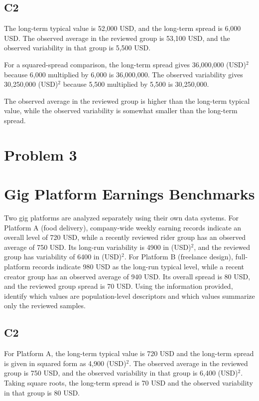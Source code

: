 \begin{ExamProblems}
\subsection*{C2}
		The long-term typical value is 52,000 USD, and the long-term spread is 6,000 USD.
		The observed average in the reviewed group is 53,100 USD, and the observed variability in that group is 5,500 USD.

		For a squared-spread comparison, the long-term spread gives 36,000,000 (USD)$^2$ because 6,000 multiplied by 6,000 is 36,000,000.
		The observed variability gives 30,250,000 (USD)$^2$ because 5,500 multiplied by 5,500 is 30,250,000.

		The observed average in the reviewed group is higher than the long-term typical value, while the observed variability is somewhat smaller than the long-term spread.


		\newpage
		\item
		\section{Problem 3}
		\section{Gig Platform Earnings Benchmarks}
		Two gig platforms are analyzed separately using their own data systems.
		For Platform A (food delivery), company-wide weekly earning records indicate an overall level of 720 USD, while a recently reviewed rider group has an observed average of 750 USD.
		Its long-run variability is 4900 in (USD)$^2$, and the reviewed group has variability of 6400 in (USD)$^2$.
		For Platform B (freelance design), full-platform records indicate 980 USD as the long-run typical level, while a recent creator group has an observed average of 940 USD.
		Its overall spread is 80 USD, and the reviewed group spread is 70 USD.
		Using the information provided, identify which values are population-level descriptors and which values summarize only the reviewed samples.

\subsection*{C2}
		For Platform A, the long-term typical value is 720 USD and the long-term spread is given in squared form as 4,900 (USD)$^2$.
		The observed average in the reviewed group is 750 USD, and the observed variability in that group is 6,400 (USD)$^2$.
		Taking square roots, the long-term spread is 70 USD and the observed variability in that group is 80 USD.


\end{ExamProblems}
